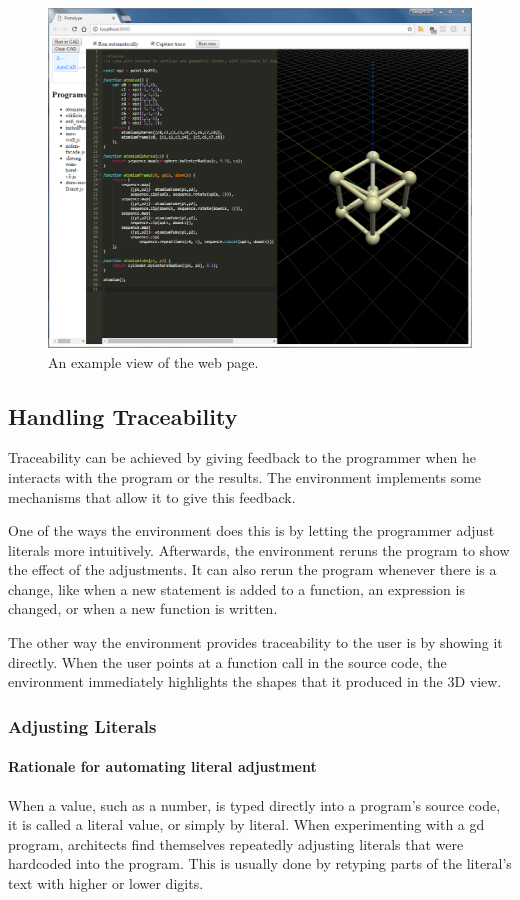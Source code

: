 \begin{figure}
  \centering
  \includegraphics[width=12cm]{./images/webpage_view}
  \caption{An example view of the web page.}
  \label{fig:page:view}
\end{figure}


\subsection{Handling Traceability}
Traceability can be achieved by giving feedback to the programmer when he interacts with the program or the results.
The environment implements some mechanisms that allow it to give this feedback.

One of the ways the environment does this is by letting the programmer adjust literals more intuitively.
Afterwards, the environment reruns the program to show the effect of the adjustments.
It can also rerun the program whenever there is a change, like when a new statement is added to a function, an expression is changed, or when a new function is written.

The other way the environment provides traceability to the user is by showing it directly.
When the user points at a function call in the source code, the environment immediately highlights the shapes that it produced in the 3D view.


\subsubsection{Adjusting Literals}
\paragraph{Rationale for automating literal adjustment}
When a value, such as a number, is typed directly into a program's source code, it is called a literal value, or simply by literal.
When experimenting with a \gls{gd} program, architects find themselves repeatedly adjusting literals that were hardcoded into the program.
This is usually done by retyping parts of the literal's text with higher or lower digits.


